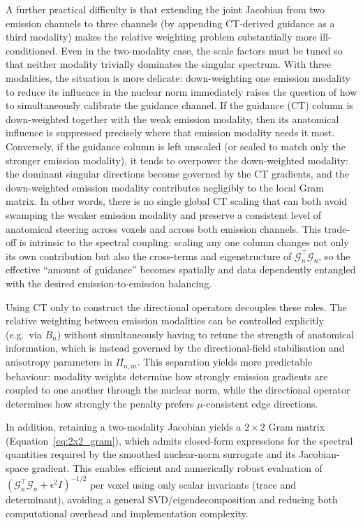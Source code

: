 A further practical difficulty is that extending the joint Jacobian from two emission channels to three channels (by appending CT-derived guidance as a third modality) makes the relative weighting problem substantially more ill-conditioned. Even in the two-modality case, the scale factors must be tuned so that neither modality trivially dominates the singular spectrum. With three modalities, the situation is more delicate: down-weighting one emission modality to reduce its influence in the nuclear norm immediately raises the question of how to simultaneously calibrate the guidance channel. If the guidance (CT) column is down-weighted together with the weak emission modality, then its anatomical influence is suppressed precisely where that emission modality needs it most. Conversely, if the guidance column is left unscaled (or scaled to match only the stronger emission modality), it tends to overpower the down-weighted modality: the dominant singular directions become governed by the CT gradients, and the down-weighted emission modality contributes negligibly to the local Gram matrix. In other words, there is no single global CT scaling that can both avoid swamping the weaker emission modality and preserve a consistent level of anatomical steering across voxels and across both emission channels. This trade-off is intrinsic to the spectral coupling: scaling any one column changes not only its own contribution but also the cross-terms and eigenstructure of $\mathcal{G}_n^\top\mathcal{G}_n$, so the effective ``amount of guidance'' becomes spatially and data dependently entangled with the desired emission-to-emission balancing.

Using CT only to construct the directional operators decouples these roles. The relative weighting between emission modalities can be controlled explicitly (e.g.\ via $B_n$) without simultaneously having to retune the strength of anatomical information, which is instead governed by the directional-field stabilisation and anisotropy parameters in $\Pi_{n,m}$. This separation yields more predictable behaviour: modality weights determine how strongly emission gradients are coupled to one another through the nuclear norm, while the directional operator determines how strongly the penalty prefers $\mu$-consistent edge directions. 

In addition, retaining a two-modality Jacobian yields a $2\times 2$ Gram matrix (Equation~\ref{eq:2x2_gram}), which admits closed-form expressions for the spectral quantities required by the smoothed nuclear-norm surrogate and its Jacobian-space gradient. This enables efficient and numerically robust evaluation of $(\mathcal{G}_n^\top\mathcal{G}_n+\epsilon^2 I)^{-1/2}$ per voxel using only scalar invariants (trace and determinant), avoiding a general SVD/eigendecomposition and reducing both computational overhead and implementation complexity.

